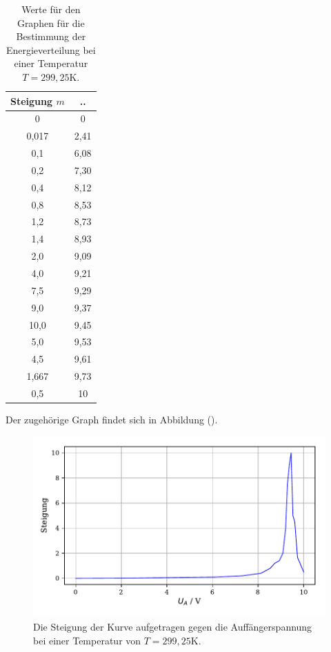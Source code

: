 \begin{table}[H]
  \centering
  \caption{Werte für den Graphen für die Bestimmung der Energieverteilung bei einer Temperatur $T=299,25$K.}
  \label{tab:Parameter}
  \begin{tabular}{c c}
    \toprule
    Steigung $m$ &  .. \\
    \bottomrule
    0 & 0\\
    0,017 & 2,41\\
    0,1 & 6,08\\
    0,2 &7,30\\
    0,4 &8,12\\
    0,8 &8,53\\
    1,2 &8,73\\
    1,4 &8,93\\
    2,0&9,09\\
    4,0 &9,21\\
    7,5 &9,29\\
    9,0 &9,37\\
    10,0 &9,45\\
    5,0 &9,53\\
    4,5 &9,61\\
    1,667&9,73\\
    0,5 & 10\\
    \bottomrule
  \end{tabular}
\end{table}

\noindent Der zugehörige Graph findet sich in Abbildung ().

\begin{figure}[H]
  \centering
  \includegraphics{plota1.pdf}
  \caption{Die Steigung der Kurve aufgetragen gegen die Auffängerspannung bei einer Temperatur von $T=299,25$K.}
  \label{fig:plot}
\end{figure}

